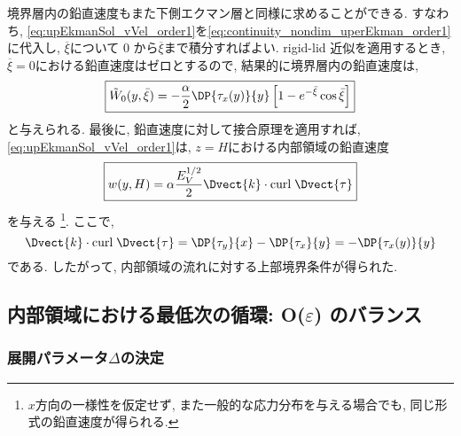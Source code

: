 境界層内の鉛直速度もまた下側エクマン層と同様に求めることができる. 
すなわち, \eqref{eq:upEkmanSol_vVel_order1}を\eqref{eq:continuity_nondim_uperEkman_order1}に代入し, 
$\overline{\xi}$について 0 から$\overline{\xi}$まで積分すればよい. 
rigid-lid 近似を適用するとき, $\overline{\xi}=0$における鉛直速度はゼロとするので, 
結果的に境界層内の鉛直速度は, 
\begin{equation}
\boxed{
 \tilde{W}_0(y,\bar{\xi}) = - \dfrac{\alpha}{2} \DP{\tau_x(y)}{y} \left[ 1 - e^{-\bar{\xi}} \cos \bar{\xi} \right]
 \label{eq:upEkmanSol_vVel_order1}
}
\end{equation}
と与えられる. 
最後に, 鉛直速度に対して接合原理を適用すれば, \eqref{eq:upEkmanSol_vVel_order1}は, 
$z=H$における内部領域の鉛直速度
\begin{equation}
\boxed{
  w(y,H) = \alpha \dfrac{E_V^{1/2}}{2}\Dvect{k} \cdot {\rm curl \;} \Dvect{ \tau }
}
\label{eq:BC_interior_upper_nodim}
\end{equation}
を与える%
\footnote{
$x$方向の一様性を仮定せず, また一般的な応力分布を与える場合でも, 
同じ形式の鉛直速度が得られる. 
}. 
ここで, 
\begin{equation}
  \Dvect{k} \cdot {\rm curl \;} \Dvect{\tau} = \DP{\tau_y}{x} - \DP{\tau_x}{y} = -\DP{\tau_x(y)}{y}
\end{equation}
である. 
したがって, 内部領域の流れに対する上部境界条件が得られた. 

\subsection{内部領域における最低次の循環: O($\varepsilon$) のバランス}

\subsubsection*{展開パラメータ$\Delta$の決定}

